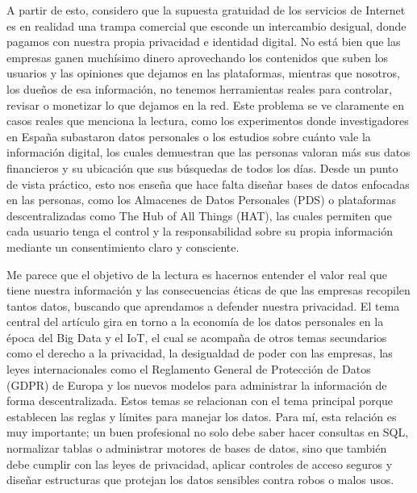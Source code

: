 A partir de esto, considero que la supuesta gratuidad de los servicios de Internet es en realidad una trampa comercial que esconde un intercambio desigual, donde pagamos con nuestra propia privacidad e identidad digital. No está bien que las empresas ganen muchísimo dinero aprovechando los contenidos que suben los usuarios y las opiniones que dejamos en las plataformas, mientras que nosotros, los dueños de esa información, no tenemos herramientas reales para controlar, revisar o monetizar lo que dejamos en la red. Este problema se ve claramente en casos reales que menciona la lectura, como los experimentos donde investigadores en España subastaron datos personales o los estudios sobre cuánto vale la información digital, los cuales demuestran que las personas valoran más sus datos financieros y su ubicación que sus búsquedas de todos los días. Desde un punto de vista práctico, esto nos enseña que hace falta diseñar bases de datos enfocadas en las personas, como los Almacenes de Datos Personales (PDS) o plataformas descentralizadas como The Hub of All Things (HAT), las cuales permiten que cada usuario tenga el control y la responsabilidad sobre su propia información mediante un consentimiento claro y consciente.

Me parece que el objetivo de la lectura es hacernos entender el valor real que tiene nuestra información y las consecuencias éticas de que las empresas recopilen tantos datos, buscando que aprendamos a defender nuestra privacidad. El tema central del artículo gira en torno a la economía de los datos personales en la época del Big Data y el IoT, el cual se acompaña de otros temas secundarios como el derecho a la privacidad, la desigualdad de poder con las empresas, las leyes internacionales como el Reglamento General de Protección de Datos (GDPR) de Europa y los nuevos modelos para administrar la información de forma descentralizada. Estos temas se relacionan con el tema principal porque establecen las reglas y límites para manejar los datos. Para mí, esta relación es muy importante; un buen profesional no solo debe saber hacer consultas en SQL, normalizar tablas o administrar motores de bases de datos, sino que también debe cumplir con las leyes de privacidad, aplicar controles de acceso seguros y diseñar estructuras que protejan los datos sensibles contra robos o malos usos.

